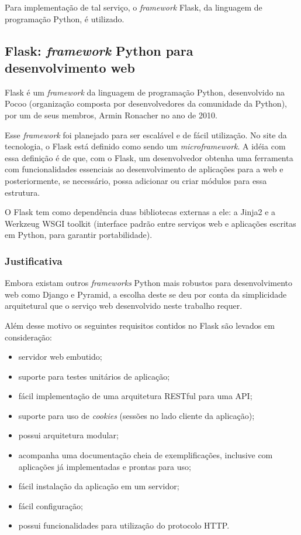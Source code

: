 Para implementação de tal serviço, o \textit{framework} Flask, da linguagem de programação Python, é utilizado.

\subsection{Flask: \textit{framework} Python para desenvolvimento web}

Flask é um \textit{framework} da linguagem de programação Python, desenvolvido na Pocoo (organização composta por desenvolvedores da comunidade da Python), por um de seus membros, Armin Ronacher no ano de 2010. 

Esse \textit{framework} foi planejado para ser escalável e de fácil utilização. No site da tecnologia, o Flask está definido como sendo um \textit{microframework}. A idéia com essa definição é de que, com o Flask, um desenvolvedor obtenha uma ferramenta com funcionalidades essenciais ao desenvolvimento de aplicações para a web e posteriormente, se necessário, possa adicionar ou criar módulos para essa estrutura.

O Flask tem como dependência duas bibliotecas externas a ele: a Jinja2 e a Werkzeug WSGI toolkit (interface padrão entre serviços web e aplicações escritas em Python, para garantir portabilidade).

\subsubsection{Justificativa}

Embora existam outros \textit{frameworks} Python mais robustos para desenvolvimento web como Django e Pyramid, a escolha deste se deu por conta da simplicidade arquitetural que o serviço web desenvolvido neste trabalho requer.

Além desse motivo os seguintes requisitos contidos no Flask são levados em consideração:
\begin{itemize}

\item servidor web embutido;
\item suporte para testes unitários de aplicação;
\item fácil implementação de uma arquitetura RESTful para uma API;
\item suporte para uso de \textit{cookies} (sessões no lado cliente da aplicação);
\item possui arquitetura modular;
\item acompanha uma documentação cheia de exemplificações, inclusive com aplicações já implementadas e prontas para uso;
\item fácil instalação da aplicação em um servidor;
\item fácil configuração;
\item possui funcionalidades para utilização do protocolo HTTP.

\end{itemize}


